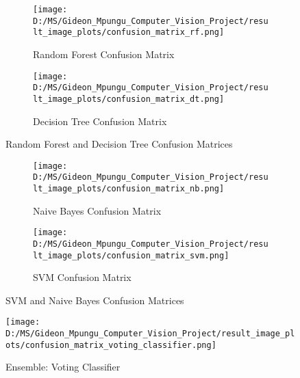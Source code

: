 \documentclass[10pt,twocolumn,letterpaper]{article}
\begin{document}
\begin{figure*}[ht]
    \centering
    
    \begin{subfigure}{0.45\textwidth}
        \texttt{[image: D:/MS/Gideon\_Mpungu\_Computer\_Vision\_Project/result\_image\_plots/confusion\_matrix\_rf.png]}
        \caption{Random Forest Confusion Matrix}
        \label{fig:rf_cm}
    \end{subfigure}
    \hfill
    \begin{subfigure}{0.45\textwidth}
        \texttt{[image: D:/MS/Gideon\_Mpungu\_Computer\_Vision\_Project/result\_image\_plots/confusion\_matrix\_dt.png]}
        \caption{Decision Tree Confusion Matrix}
        \label{fig:dt_cm}
    \end{subfigure}
    
    \caption{Random Forest and Decision Tree Confusion Matrices}
    \label{fig:rf_and_dt_cm}
\end{figure*}

\begin{figure*}[ht]
    \centering
    
    \begin{subfigure}{0.45\textwidth}
        \texttt{[image: D:/MS/Gideon\_Mpungu\_Computer\_Vision\_Project/result\_image\_plots/confusion\_matrix\_nb.png]}
        \caption{Naive Bayes Confusion Matrix}
        \label{fig:nb_cm}
    \end{subfigure}
    \hfill
    \begin{subfigure}{0.45\textwidth}
        \texttt{[image: D:/MS/Gideon\_Mpungu\_Computer\_Vision\_Project/result\_image\_plots/confusion\_matrix\_svm.png]}
        \caption{SVM Confusion Matrix}
        \label{fig:svm_cm}
    \end{subfigure}
    
    \caption{SVM and Naive Bayes Confusion Matrices}
    \label{fig:svm_and_nb_cm}
\end{figure*}

\begin{figure}[h]
    \texttt{[image: D:/MS/Gideon\_Mpungu\_Computer\_Vision\_Project/result\_image\_plots/confusion\_matrix\_voting\_classifier.png]}
    \caption{Ensemble: Voting Classifier}
    \label{fig:voting_classifier}
\end{figure}
\end{document}
